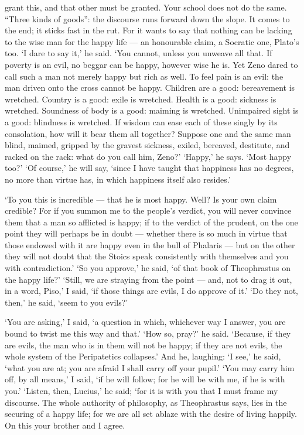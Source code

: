  grant this, and that other must be granted. Your school does not do the same. “Three kinds of goods”: the discourse runs forward down the slope. It comes to the end; it sticks fast in the rut. For it wants to say that nothing can be lacking to the wise man for the happy life — an honourable claim, a Socratic one, Plato’s too. ‘I dare to say it,’ he said. ‘You cannot, unless you unweave all that. If poverty is an evil, no beggar can be happy, however wise he is. Yet Zeno dared to call such a man not merely happy but rich as well. To feel pain is an evil: the man driven onto the cross cannot be happy. Children are a good: bereavement is wretched. Country is a good: exile is wretched. Health is a good: sickness is wretched. Soundness of body is a good: maiming is wretched. Unimpaired sight is a good: blindness is wretched. If wisdom can ease each of these singly by its consolation, how will it bear them all together? Suppose one and the same man blind, maimed, gripped by the gravest sickness, exiled, bereaved, destitute, and racked on the rack: what do you call him, Zeno?’ ‘Happy,’ he says. ‘Most happy too?’ ‘Of course,’ he will say, ‘since I have taught that happiness has no degrees, no more than virtue has, in which happiness itself also resides.’

 ‘To you this is incredible — that he is most happy. Well? Is your own claim credible? For if you summon me to the people’s verdict, you will never convince them that a man so afflicted is happy; if to the verdict of the prudent, on the one point they will perhaps be in doubt — whether there is so much in virtue that those endowed with it are happy even in the bull of Phalaris — but on the other they will not doubt that the Stoics speak consistently with themselves and you with contradiction.’ ‘So you approve,’ he said, ‘of that book of Theophrastus on the happy life?’ ‘Still, we are straying from the point — and, not to drag it out, in a word, Piso,’ I said, ‘if those things are evils, I do approve of it.’ ‘Do they not, then,’ he said, ‘seem to you evils?’

 ‘You are asking,’ I said, ‘a question in which, whichever way I answer, you are bound to twist me this way and that.’ ‘How so, pray?’ he said. ‘Because, if they are evils, the man who is in them will not be happy; if they are not evils, the whole system of the Peripatetics collapses.’ And he, laughing: ‘I see,’ he said, ‘what you are at; you are afraid I shall carry off your pupil.’ ‘You may carry him off, by all means,’ I said, ‘if he will follow; for he will be with me, if he is with you.’ ‘Listen, then, Lucius,’ he said; ‘for it is with you that I must frame my discourse. The whole authority of philosophy, as Theophrastus says, lies in the securing of a happy life; for we are all set ablaze with the desire of living happily. On this your brother and I agree.

